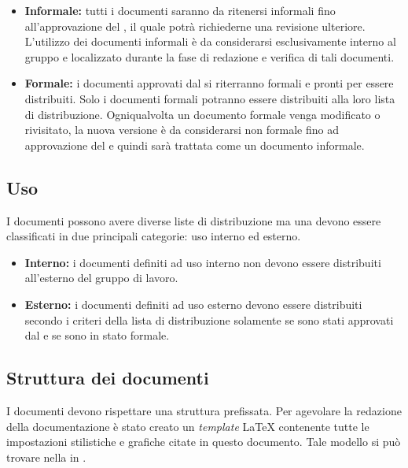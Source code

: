 \documentclass[12pt,a4paper]{article}
\begin{document}
\begin{itemize}
	\item \textbf{Informale:} tutti i documenti saranno da ritenersi informali fino all'approvazione del \PM, il quale potrà richiederne una revisione ulteriore. L'utilizzo dei documenti informali è da considerarsi esclusivamente interno al gruppo e localizzato durante la fase di redazione e verifica di tali documenti.
	\item \textbf{Formale:} i documenti approvati dal \PM{} si riterranno formali e pronti per essere distribuiti. Solo i documenti formali potranno essere distribuiti alla loro lista di distribuzione. Ogniqualvolta un documento formale venga modificato o rivisitato, la nuova versione è da considerarsi non formale fino ad approvazione del \PM e quindi sarà trattata come un documento informale.
\end{itemize}

\subsection{Uso}
I documenti possono avere diverse liste di distribuzione ma una devono essere classificati in due principali categorie: uso interno ed esterno.

\begin{itemize}
	\item \textbf{Interno:} i documenti definiti ad uso interno non devono essere distribuiti all'esterno del gruppo di lavoro.
	\item \textbf{Esterno:} i documenti definiti ad uso esterno devono essere distribuiti secondo i criteri della lista di distribuzione solamente se sono stati approvati dal \PM{} e se sono in stato formale.  
\end{itemize}

\subsection{Struttura dei documenti}
I documenti devono rispettare una struttura prefissata. Per agevolare la redazione della documentazione è stato creato un \emph{template} \LaTeX{} contenente tutte le impostazioni stilistiche e grafiche citate in questo documento. Tale modello si può trovare nella  in .
\end{document}
